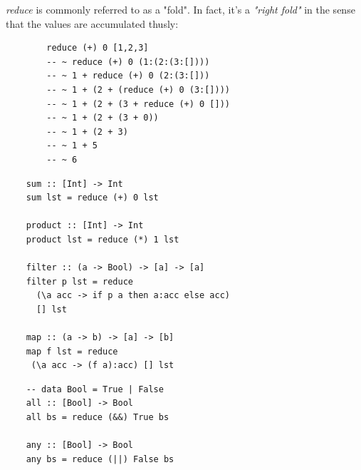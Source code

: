 \documentclass[tikz]{beamer}
\theoremstyle{definition}
\begin{document}

\begin{frame}[fragile] 
	\textit{reduce} is commonly referred to as a "fold". In fact, 
	it's a \textit{"right fold"} in the sense that the values are accumulated thusly:
	
	\begin{center}
		\begin{verbatim}
		reduce (+) 0 [1,2,3]
		-- ~ reduce (+) 0 (1:(2:(3:[])))
		-- ~ 1 + reduce (+) 0 (2:(3:[]))
		-- ~ 1 + (2 + (reduce (+) 0 (3:[])))
		-- ~ 1 + (2 + (3 + reduce (+) 0 []))
		-- ~ 1 + (2 + (3 + 0))
		-- ~ 1 + (2 + 3)
		-- ~ 1 + 5
		-- ~ 6
		\end{verbatim}
	\end{center}
\end{frame}



\begin{frame}[fragile]
	\begin{center}
		\begin{verbatim}
	sum :: [Int] -> Int
	sum lst = reduce (+) 0 lst 
		
	product :: [Int] -> Int
	product lst = reduce (*) 1 lst
		
	filter :: (a -> Bool) -> [a] -> [a]
	filter p lst = reduce 
	  (\a acc -> if p a then a:acc else acc)
	  [] lst
		
	map :: (a -> b) -> [a] -> [b]
	map f lst = reduce
	 (\a acc -> (f a):acc) [] lst
	\end{verbatim}
	\end{center}
\end{frame}

\begin{frame}[fragile]
	\begin{center}
		\begin{verbatim}
	-- data Bool = True | False
	all :: [Bool] -> Bool
	all bs = reduce (&&) True bs
		
	any :: [Bool] -> Bool
	any bs = reduce (||) False bs
		\end{verbatim}
	\end{center}
\end{frame}
\end{document}
